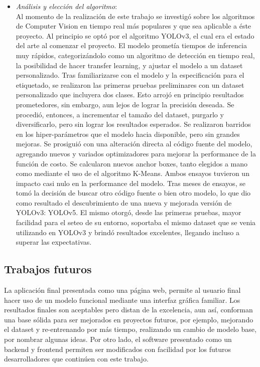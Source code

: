 \begin{itemize}
        \item \textit{Análisis y elección del algoritmo}: \\
            Al momento de la realización de este trabajo se investigó sobre los algoritmos de Computer Vision en tiempo real más populares y que sea aplicable a éste proyecto. Al principio se optó por el algoritmo YOLOv3, el cual era el estado del arte al comenzar el proyecto. El modelo prometía tiempos de inferencia muy rápidos, categorizándolo como un algoritmo de detección en tiempo real, la posibilidad de hacer transfer learning, y ajustar el modelo a un dataset personalizado. Tras familiarizarse con el modelo y la especificación para el etiquetado, se realizaron las primeras pruebas preliminares con un dataset personalizado que incluyera dos clases. Esto arrojó en principio resultados prometedores, sin embargo, aun lejos de lograr la precisión deseada. Se procedió, entonces, a incrementar el tamaño del dataset, purgarlo y diversificarlo, pero sin lograr los resultados esperados. Se realizaron barridos en los hiper-parámetros que el modelo hacia disponible, pero sin grandes mejoras. Se prosiguió con una alteración directa al código fuente del modelo, agregando nuevos y variados optimizadores para mejorar la performance de la función de costo. Se calcularon nuevos anchor boxes, tanto elegidos a mano como mediante el uso de el algoritmo K-Means. Ambos ensayos tuvieron un impacto casi nulo en la performance del modelo. Tras meses de ensayos, se tomó la decisión de buscar otro código fuente o bien otro modelo, lo que dio como resultado el descubrimiento de una nueva y mejorada versión de YOLOv3: YOLOv5. El mismo otorgó, desde las primeras pruebas, mayor facilidad para el seteo de su entorno, soportaba el mismo dataset que se venia utilizando en YOLOv3 y brindó resultados excelentes, llegando incluso a superar las expectativas.
        
 \end{itemize}

\subsection{Trabajos futuros}
La aplicación final presentada como una página web, permite al usuario final hacer uso de un modelo funcional mediante una interfaz gráfica familiar. Los resultados finales son aceptables pero distan de la excelencia, aun así, conforman una base sólida para ser mejorados en proyectos futuros, por ejemplo, mejorando el dataset y re-entrenando por más tiempo, realizando un cambio de modelo base, por nombrar algunas ideas. Por otro lado, el software presentado como un backend y frontend permiten ser modificados con facilidad por los futuros desarrolladores que continúen con este trabajo.
